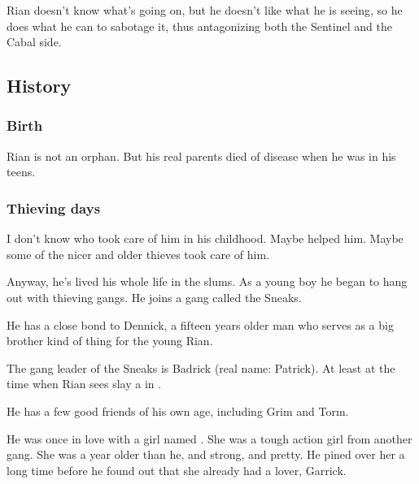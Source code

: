 Rian doesn't know what's going on, but he doesn't like what he is seeing, so he does what he can to sabotage it, thus antagonizing both the Sentinel and the Cabal side. 









\subsection{History}
\subsubsection{Birth}
Rian is not an orphan. 
But his real parents died of disease when he was in his teens. 







\subsubsection{Thieving days}
I don't know who took care of him in his childhood. 
Maybe  helped him. 
Maybe some of the nicer and older thieves took care of him. 

Anyway, he's lived his whole life in the slums. 
As a young boy he began to hang out with thieving gangs. 
He joins a gang called the Sneaks. 

He has a close bond to Dennick, a fifteen years older man who serves as a big brother kind of thing for the young Rian. 

The gang leader of the Sneaks is Badrick (real name: Patrick). 
At least at the time when Rian sees {\Ishnaruchaefir} slay a \ghobal{} in \Malcur. 

He has a few good friends of his own age, including Grim and Torm. 

He was once in love with a girl named \Mya. 
She was a tough action girl from another gang. 
She was a year older than he, and strong, and pretty. 
He pined over her a long time before he found out that she already had a lover, Garrick. 

